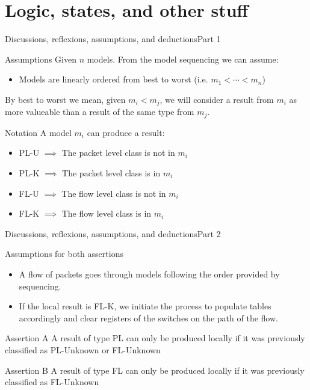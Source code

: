 \documentclass[8pt]{beamer}
\begin{document}
\section{Logic, states, and other stuff}
\begin{frame}{Discussions, reflexions, assumptions, and deductions}{Part 1}
    \begin{exampleblock}{Assumptions}
        Given $n$ models.
        From the model sequencing we can assume:
        \begin{itemize}
            \item Models are linearly ordered from best to worst
                (i.e. \(m_1<\dotsb<m_n\))
        \end{itemize}
        By best to worst we mean, given \(m_i<m_j\), we will consider a result
        from \(m_i\) as more valueable than a result of the same type from \(m_j\).
    \end{exampleblock}

    \begin{block}{Notation}
        A model \(m_i\) can produce a result:
        \begin{itemize}
            \item PL-U \(\implies\) The packet level class is not in \(m_i\)
            \item PL-K \(\implies\) The packet level class is in \(m_i\)
            \item FL-U \(\implies\) The flow level class is not in \(m_i\)
            \item FL-K \(\implies\) The flow level class is in \(m_i\)
        \end{itemize}
    \end{block}
\end{frame}

\begin{frame}{Discussions, reflexions, assumptions, and deductions}{Part 2}
    \begin{exampleblock}{Assumptions for both assertions}
        \begin{itemize}
            \item A flow of packets goes through models following the order
                provided by sequencing.
            \item If the local result is FL-K, we initiate the process to
                populate tables accordingly and clear registers of the switches
                on the path of the flow.
        \end{itemize}
    \end{exampleblock}

    \begin{alertblock}{Assertion A}
        A result of type PL can only be produced locally if it was previously classified as PL-Unknown or FL-Unknown
    \end{alertblock}

    \begin{alertblock}{Assertion B}
        A result of type FL can only be produced locally if it was previously classified as FL-Unknown
    \end{alertblock}
\end{frame}
\end{document}

